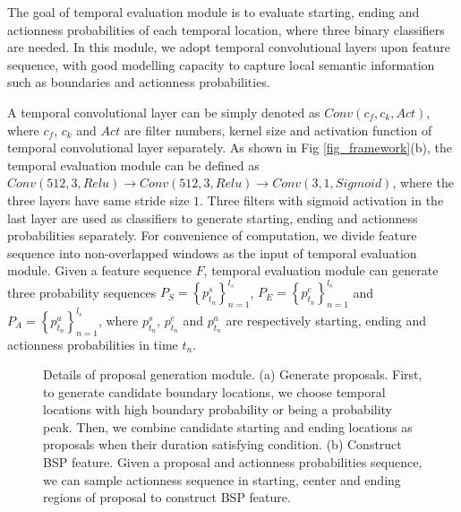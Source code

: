 \documentclass[runningheads]{llncs}
\begin{document}
The goal of temporal evaluation module is to evaluate starting, ending and actionness probabilities of each temporal location, where three binary classifiers are needed. In this module, we adopt temporal convolutional layers upon feature sequence, with good modelling capacity to capture local semantic information such as boundaries and actionness probabilities.

A temporal convolutional layer can be simply  denoted as $Conv(c_f,c_k,Act)$, where $c_f$, $c_k$ and $Act$ are filter numbers, kernel size and activation function of temporal convolutional layer separately. As shown in Fig \ref{fig_framework}(b), the temporal evaluation module can be defined as $Conv(512,3,Relu)\rightarrow Conv(512,3,Relu)\rightarrow Conv(3,1,Sigmoid)$, where the three layers have same stride size $1$.
Three filters with sigmoid activation in the last layer are used as classifiers to generate starting, ending and actionness probabilities separately.
For convenience of computation, we divide feature sequence  into non-overlapped windows as the input of temporal evaluation module.
Given a feature sequence $F$, temporal evaluation module can  generate three probability sequences $P_S=\left \{ p^s_{t_n} \right \}_{n=1}^{l_s}$, $P_E=\left \{ p^e_{t_n} \right \}_{n=1}^{l_s}$ and $P_A=\left \{ p^a_{t_n} \right \}_{n=1}^{l_s}$, where $p^s_{t_n}$, $p^e_{t_n}$ and $p^a_{t_n}$ are respectively starting, ending and actionness probabilities in time $t_n$.


\begin{figure}[t]
\setlength{\abovecaptionskip}{-0.0cm} %
\setlength{\belowcaptionskip}{-0.5cm} %
\centering
\makeatletter\def\@captype{figure}\makeatother
{}
\hspace{-0.2 in}
\caption{Details of proposal generation module. (a) Generate proposals. First, to generate candidate boundary locations, we choose temporal locations with high boundary probability or being a probability peak. Then, we combine candidate starting and ending locations as proposals when their duration satisfying  condition.
(b) Construct BSP feature. Given a proposal and actionness probabilities sequence, we can sample actionness sequence in starting, center and ending regions of proposal to construct BSP feature.}
\label{fig_pgm}
\end{figure}
\end{document}
